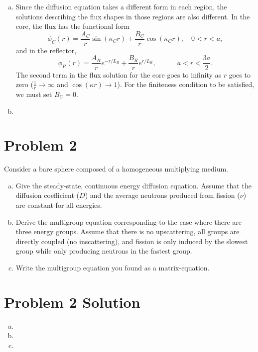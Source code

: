 \documentclass{report}
\begin{document}
\begin{enumerate}[a)]
\item

Since the diffusion equation takes a different form in each region, the solutions describing the flux shapes in those regions are also different. In the core, the flux has the functional form
$$ \phi_C(r) = \frac{A_C}{r} \sin\left(\kappa_C r\right) + \frac{B_C}{r} \cos\left(\kappa_C r\right) , \quad 0 < r < a,$$
and in the reflector,
$$ \phi_R(r) = \frac{A_R}{r} e^{-r/L_R} + \frac{B_R}{r} e^{r/L_R}, \quad\quad\quad a < r < \frac{3a}{2} .$$
The second term in the flux solution for the core goes to infinity as $r$ goes to zero ($\frac{1}{r} \rightarrow \infty$ and $\cos(\kappa r) \rightarrow 1$). For the finiteness condition to be satisfied, we must set $B_C = 0$. 
\item

\end{enumerate}


\newpage
\section*{Problem 2}

Consider a bare sphere composed of a homogeneous multiplying medium.
\begin{enumerate}[a)]
\item Give the steady-state, continuous energy diffusion equation. Assume that the diffusion coefficient ($D$) and the average neutrons produced from fission ($\nu$) are constant for all energies.
\item Derive the multigroup equation corresponding to the case where there are three energy groups. Assume that there is no upscattering, all groups are directly coupled (no inscattering), and fission is only induced by the slowest group while only producing neutrons in the fastest group.
\item Write the multigroup equation you found as a matrix-equation.
\end{enumerate}



\section*{Problem 2 Solution}

\begin{enumerate}[a)]

\item 
\item
\item

\end{enumerate}
\end{document}
